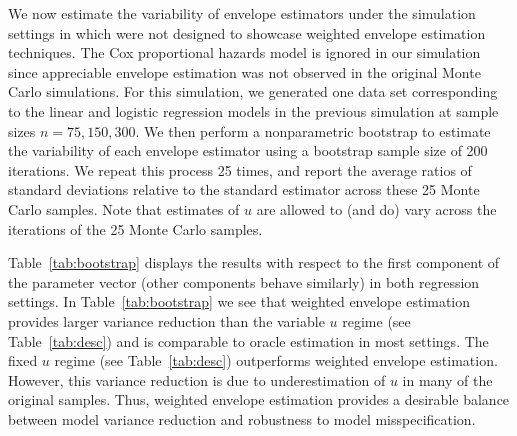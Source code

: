 \documentclass{article}\usepackage[]{graphicx}\usepackage[]{color}
\begin{document}
\begin{table}[t]
\label{tab:tab3inzhangmai}
\end{table}


We now estimate the variability of envelope estimators under the simulation settings in \citet{zhangmai} %
which were not designed to showcase weighted envelope estimation techniques. The Cox proportional hazards model is ignored in our simulation since appreciable envelope estimation was not observed in the original Monte Carlo simulations. For this simulation, we generated one data set corresponding to the linear and logistic regression models in the previous simulation at sample sizes $n = 75, 150, 300$. We then perform a nonparametric bootstrap to estimate the variability of each envelope estimator using a bootstrap sample size of 200 iterations. We repeat this process 25 times, and report the average ratios of standard deviations relative to the standard estimator across these 25 Monte Carlo samples. Note that estimates of $u$ are allowed to (and do) vary across the iterations of the 25 Monte Carlo samples. 

Table~\ref{tab:bootstrap} displays the results with respect to the first component of the parameter vector (other components behave similarly) in both regression settings. In Table~\ref{tab:bootstrap} we see that weighted envelope estimation provides larger variance reduction than the variable $u$ regime (see Table~\ref{tab:desc}) and is comparable to oracle estimation in most settings. The fixed $u$ regime (see Table~\ref{tab:desc}) outperforms weighted envelope estimation. However, this variance reduction is due to underestimation of $u$ in many of the original samples. Thus, weighted envelope estimation provides a desirable balance between model variance reduction and robustness to model misspecification.
\end{document}
